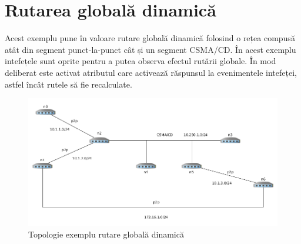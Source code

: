 \documentclass[12pt, a4paper, oneside, romanian]{teza-upb}
\begin{document}
\section{Rutarea globală dinamică}

Acest exemplu pune în valoare rutare globală dinamică folosind o rețea compusă atât din segment punct-la-punct cât și un segment CSMA/CD. În acest exemplu intefețele sunt oprite pentru a putea observa efectul rutării globale. În mod deliberat este activat atributul care activează răspunsul la evenimentele intefeței, astfel încât rutele să fie recalculate.

\begin{figure}[H]
\centering
\includegraphics*[scale=0.5]{img/dynamic_global_routing_topo.png}
\caption{Topologie exemplu rutare globală dinamică}
\end{figure}
\end{document}
